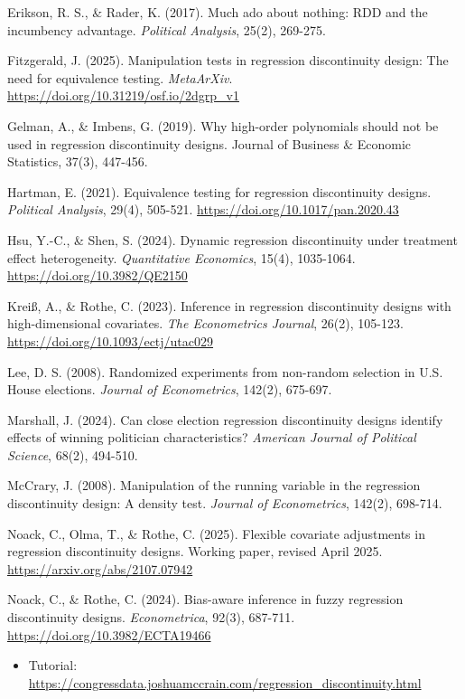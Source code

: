 \documentclass[
]{article}
\providecommand{\tightlist}{%
  \setlength{\itemsep}{0pt}\setlength{\parskip}{0pt}}
\begin{document}
Erikson, R. S., \& Rader, K. (2017). Much ado about nothing: RDD and the incumbency advantage. \emph{Political Analysis}, 25(2), 269-275.

Fitzgerald, J. (2025). Manipulation tests in regression discontinuity design: The need for equivalence testing. \emph{MetaArXiv}. \url{https://doi.org/10.31219/osf.io/2dgrp_v1}

Gelman, A., \& Imbens, G. (2019). Why high-order polynomials should not be used in regression discontinuity designs. Journal of Business \& Economic Statistics, 37(3), 447-456.

Hartman, E. (2021). Equivalence testing for regression discontinuity designs. \emph{Political Analysis}, 29(4), 505-521. \url{https://doi.org/10.1017/pan.2020.43}

Hsu, Y.-C., \& Shen, S. (2024). Dynamic regression discontinuity under treatment effect heterogeneity. \emph{Quantitative Economics}, 15(4), 1035-1064. \url{https://doi.org/10.3982/QE2150}

Kreiß, A., \& Rothe, C. (2023). Inference in regression discontinuity designs with high-dimensional covariates. \emph{The Econometrics Journal}, 26(2), 105-123. \url{https://doi.org/10.1093/ectj/utac029}

Lee, D. S. (2008). Randomized experiments from non-random selection in U.S. House elections. \emph{Journal of Econometrics}, 142(2), 675-697.

Marshall, J. (2024). Can close election regression discontinuity designs identify effects of winning politician characteristics? \emph{American Journal of Political Science}, 68(2), 494-510.

McCrary, J. (2008). Manipulation of the running variable in the regression discontinuity design: A density test. \emph{Journal of Econometrics}, 142(2), 698-714.

Noack, C., Olma, T., \& Rothe, C. (2025). Flexible covariate adjustments in regression discontinuity designs. Working paper, revised April 2025. \url{https://arxiv.org/abs/2107.07942}

Noack, C., \& Rothe, C. (2024). Bias-aware inference in fuzzy regression discontinuity designs. \emph{Econometrica}, 92(3), 687-711. \url{https://doi.org/10.3982/ECTA19466}

\begin{itemize}
\tightlist
\item
  Tutorial: \url{https://congressdata.joshuamccrain.com/regression_discontinuity.html}
\end{itemize}
\end{document}
